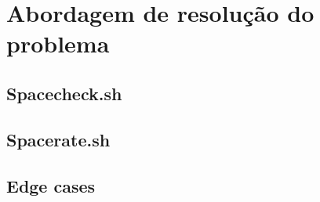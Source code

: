 \chapter{Abordagem de resolução do problema}
\section{Spacecheck.sh}
\newpage
\section{Spacerate.sh}
\section{Edge cases}
\newpage

